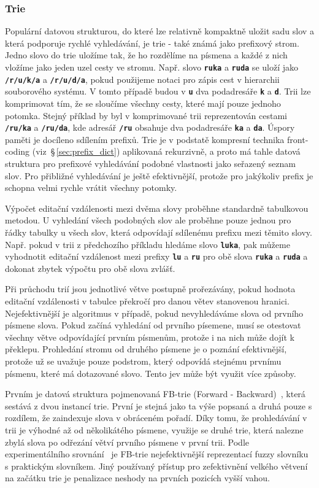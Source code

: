 \documentclass[11pt,letterpaper,oneside,openright]{book}
\newcommand{\bftt}[1]{\texttt{\textbf{#1}}}
\begin{document}
\subsubsection{Trie} \label{sec:trie}
Populární datovou strukturou, do které lze relativně kompaktně uložit sadu slov
a která podporuje rychlé vyhledávání, je trie - také známá jako prefixový strom.
Jedno slovo do trie uložíme tak, že ho rozdělíme na písmena a každé z nich
vložíme jako jeden uzel cesty ve stromu. Např. slovo \bftt{ruka} a \bftt{ruda}
se uloží jako \bftt{/r/u/k/a} a \bftt{/r/u/d/a}, pokud použijeme notaci pro
zápis cest v hierarchii souborového systému. V tomto případě budou v
 \bftt{u} dva podadresáře \bftt{k} a \bftt{d}. Trii lze
komprimovat tím, že se sloučíme všechny cesty, které mají pouze jednoho
potomka. Stejný příklad by byl v komprimované trii reprezentován cestami
\bftt{/ru/ka} a \bftt{/ru/da}, kde adresář \bftt{/ru} obsahuje dva podadresáře
\bftt{ka} a \bftt{da}. Úspory paměti je docíleno sdílením prefixů. Trie je v
podstatě kompresní technika front-coding (viz~\S\,\ref{sec:prefix_dict})
aplikovaná rekurzivně, a proto má tahle datová struktura pro prefixové
vyhledávání podobné vlastnosti jako seřazený seznam slov. Pro přibližné
vyhledávání je ještě efektivnější, protože pro jakýkoliv prefix je schopna
velmi rychle vrátit všechny potomky.

Výpočet editační vzdálenosti mezi dvěma slovy proběhne standardně tabulkovou
metodou. U vyhledání všech podobných slov ale proběhne pouze jednou pro řádky
tabulky u všech slov, která odpovídají sdílenému prefixu mezi těmito slovy.
Např. pokud v trii z předchozího příkladu hledáme slovo \bftt{luka}, pak můžeme
vyhodnotit editační vzdálenost mezi prefixy \bftt{lu} a \bftt{ru} pro obě slova
\bftt{ruka} a \bftt{ruda} a dokonat zbytek výpočtu pro obě slova zvlášť.

Při průchodu trií jsou jednotlivé větve postupně prořezávány, pokud hodnota
editační vzdálenosti v tabulce překročí pro danou větev stanovenou hranici.
Nejefektivnější je algoritmus v případě, pokud nevyhledáváme slova od prvního
písmene slova. Pokud začíná vyhledání od prvního písemene, musí se otestovat
všechny větve odpovídající prvním písmenům, protože i na nich může dojít k
překlepu. Prohledání stromu od druhého písmene je o poznání efektivnější,
protože už se uvažuje pouze podstrom, který odpovídá stejnému prvnímu písmenu,
které má dotazované slovo. Tento jev může být využit více způsoby.

Prvním je datová struktura pojmenovaná FB-trie (Forward -
Backward)~\cite{Mihov:2004:FAS:1105587.1105590}, která sestává z dvou instancí
trie. První je stejná jako ta výše popsaná a druhá pouze s rozdílem, že
zaindexuje slova v obráceném pořadí. Díky tomu, že prohledávání v trii je
výhodné až od několikátého písmene, využije se druhé trie, která nalezne zbylá
slova po odřezání větví prvního písmene v první trii. Podle experimentálního
srovnání~\cite{Boytsov:2011:IMA:1963190.1963191} je FB-trie nejefektivnější
reprezentací fuzzy slovníku s praktickým slovníkem. Jiný používaný přístup pro
zefektivnění velkého větvení na začátku trie je penalizace neshody na prvních
pozicích vyšší vahou.
\end{document}
